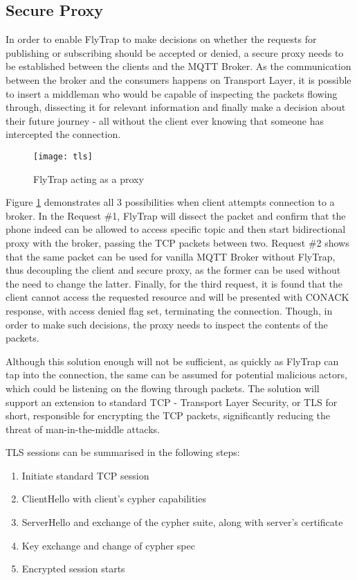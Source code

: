 \subsection{Secure Proxy}
In order to enable FlyTrap to make decisions on whether the requests for publishing or subscribing should be accepted or denied, a secure proxy needs to be established between the clients and the MQTT Broker. As the communication between the broker and the consumers happens on Transport Layer, it is possible to insert a middleman who would be capable of inspecting the packets flowing through, dissecting it for relevant information and finally make a decision about their future journey - all without the client ever knowing that someone has intercepted the connection. 
\begin{figure}[h]
    \centering
    \texttt{[image: tls]}
    \caption{FlyTrap acting as a proxy}
    \label{fig:tls}
\end{figure}
Figure \ref{fig:tls} demonstrates all 3 possibilities when client attempts connection to a broker. In the Request \#1, FlyTrap will dissect the packet and confirm that the phone indeed can be allowed to access specific topic and then start bidirectional proxy with the broker, passing the TCP packets between two. Request \#2 shows that the same packet can be used for vanilla MQTT Broker without FlyTrap, thus decoupling the client and secure proxy, as the former can be used without the need to change the latter. Finally, for the third request, it is found that the client cannot access the requested resource and will be presented with CONACK response, with access denied flag set, terminating the connection. Though, in order to make such decisions, the proxy needs to inspect the contents of the packets.

Although this solution enough will not be sufficient, as quickly as FlyTrap can tap into the connection, the same can be assumed for potential malicious actors, which could be listening on the flowing through packets. The solution will support an extension to standard TCP - Transport Layer Security, or TLS for short, responsible for encrypting the TCP packets, significantly reducing the threat of man-in-the-middle attacks.

TLS sessions can be summarised in the following steps:
\begin{enumerate}
\item Initiate standard TCP session
\item ClientHello with client's cypher capabilities 
\item ServerHello and exchange of the cypher suite, along with server's certificate
\item Key exchange and change of cypher spec
\item Encrypted session starts
\end{enumerate}

